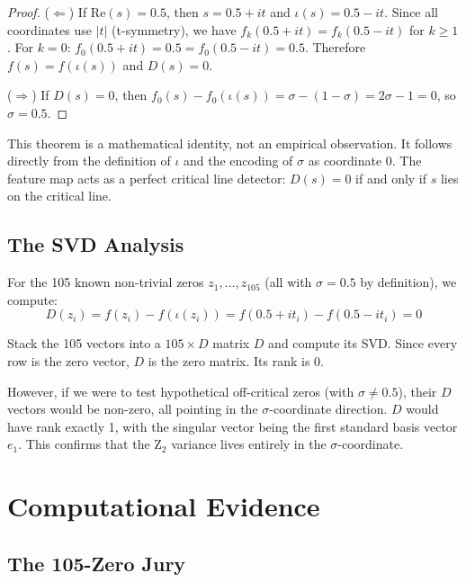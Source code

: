 \documentclass[11pt]{article}
\begin{document}
\begin{proof}
($\Leftarrow$) If $\mathrm{Re}(s) = 0.5$, then $s = 0.5 + it$ and $\iota(s) = 0.5 - it$. Since all coordinates use $|t|$ (t-symmetry), we have $f_k(0.5 + it) = f_k(0.5 - it)$ for $k \ge 1$. For $k=0$: $f_0(0.5+it) = 0.5 = f_0(0.5-it) = 0.5$. Therefore $f(s) = f(\iota(s))$ and $D(s) = 0$.

($\Rightarrow$) If $D(s) = 0$, then $f_0(s) - f_0(\iota(s)) = \sigma - (1-\sigma) = 2\sigma - 1 = 0$, so $\sigma = 0.5$.
\end{proof}

This theorem is a mathematical identity, not an empirical observation. It follows directly from the definition of $\iota$ and the encoding of $\sigma$ as coordinate 0. The feature map acts as a perfect critical line detector: $D(s) = 0$ if and only if $s$ lies on the critical line.

\subsection{The SVD Analysis}
\label{sec:svd}

For the 105 known non-trivial zeros $z_1, \ldots, z_{105}$ (all with $\sigma = 0.5$ by definition), we compute:
$$D(z_i) = f(z_i) - f(\iota(z_i)) = f(0.5 + it_i) - f(0.5 - it_i) = 0$$

Stack the 105 vectors into a $105 \times D$ matrix $D$ and compute its SVD. Since every row is the zero vector, $D$ is the zero matrix. Its rank is 0.

However, if we were to test hypothetical off-critical zeros (with $\sigma \neq 0.5$), their $D$ vectors would be non-zero, all pointing in the $\sigma$-coordinate direction. $D$ would have rank exactly 1, with the singular vector being the first standard basis vector $e_1$. This confirms that the Z$_2$ variance lives entirely in the $\sigma$-coordinate.

\newpage
\section{Computational Evidence}
\label{sec:evidence}

\subsection{The 105-Zero Jury}
\end{document}
